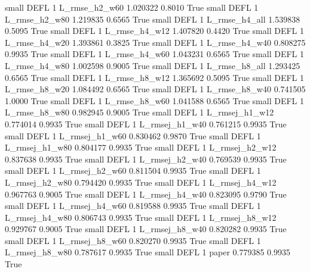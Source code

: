      small     DEFL                 1  L_rmse_h2_w60   1.020322      0.8010    True
     small     DEFL                 1  L_rmse_h2_w80   1.219835      0.6565    True
     small     DEFL                 1  L_rmse_h4_all   1.539838      0.5095    True
     small     DEFL                 1  L_rmse_h4_w12   1.407820      0.4420    True
     small     DEFL                 1  L_rmse_h4_w20   1.393861      0.3825    True
     small     DEFL                 1  L_rmse_h4_w40   0.808275      0.9935    True
     small     DEFL                 1  L_rmse_h4_w60   1.043231      0.6565    True
     small     DEFL                 1  L_rmse_h4_w80   1.002598      0.9005    True
     small     DEFL                 1  L_rmse_h8_all   1.293425      0.6565    True
     small     DEFL                 1  L_rmse_h8_w12   1.365692      0.5095    True
     small     DEFL                 1  L_rmse_h8_w20   1.084492      0.6565    True
     small     DEFL                 1  L_rmse_h8_w40   0.741505      1.0000    True
     small     DEFL                 1  L_rmse_h8_w60   1.041588      0.6565    True
     small     DEFL                 1  L_rmse_h8_w80   0.982945      0.9005    True
     small     DEFL                 1 L_rmsej_h1_w12   0.774014      0.9935    True
     small     DEFL                 1 L_rmsej_h1_w40   0.761215      0.9935    True
     small     DEFL                 1 L_rmsej_h1_w60   0.830462      0.9870    True
     small     DEFL                 1 L_rmsej_h1_w80   0.804177      0.9935    True
     small     DEFL                 1 L_rmsej_h2_w12   0.837638      0.9935    True
     small     DEFL                 1 L_rmsej_h2_w40   0.769539      0.9935    True
     small     DEFL                 1 L_rmsej_h2_w60   0.811504      0.9935    True
     small     DEFL                 1 L_rmsej_h2_w80   0.794420      0.9935    True
     small     DEFL                 1 L_rmsej_h4_w12   0.967763      0.9005    True
     small     DEFL                 1 L_rmsej_h4_w40   0.823095      0.9790    True
     small     DEFL                 1 L_rmsej_h4_w60   0.819588      0.9935    True
     small     DEFL                 1 L_rmsej_h4_w80   0.806743      0.9935    True
     small     DEFL                 1 L_rmsej_h8_w12   0.929767      0.9005    True
     small     DEFL                 1 L_rmsej_h8_w40   0.820282      0.9935    True
     small     DEFL                 1 L_rmsej_h8_w60   0.820270      0.9935    True
     small     DEFL                 1 L_rmsej_h8_w80   0.787617      0.9935    True
     small     DEFL                 1          paper   0.779385      0.9935    True
